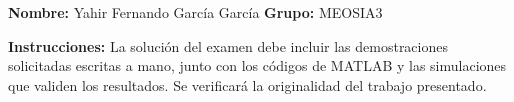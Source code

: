 \documentclass[12pt,letterpaper,twoside]{article}
\begin{document}
\begin{center}
     \\
     \\[0.5cm]
     \\
     \\[0.5cm]
     \\[0.5cm]
\end{center} \par

\textbf{Nombre:} Yahir Fernando García García     \hspace{5cm}    \textbf{Grupo:} MEOSIA3\par\vspace{0.1cm}
\textbf{Instrucciones:} La solución del examen debe incluir las demostraciones solicitadas escritas a mano, junto con los códigos de MATLAB y las simulaciones que validen los resultados. Se verificará la originalidad del trabajo
presentado.


\end{document}
